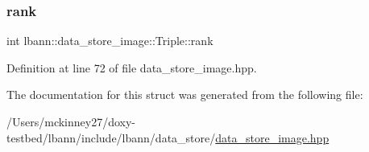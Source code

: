 \subsubsection{\texorpdfstring{rank}{rank}}
{\footnotesize\ttfamily int lbann\+::data\+\_\+store\+\_\+image\+::\+Triple\+::rank}



Definition at line 72 of file data\+\_\+store\+\_\+image.\+hpp.



The documentation for this struct was generated from the following file\+:\begin{DoxyCompactItemize}
\item 
/\+Users/mckinney27/doxy-\/testbed/lbann/include/lbann/data\+\_\+store/\hyperlink{data__store__image_8hpp}{data\+\_\+store\+\_\+image.\+hpp}\end{DoxyCompactItemize}
